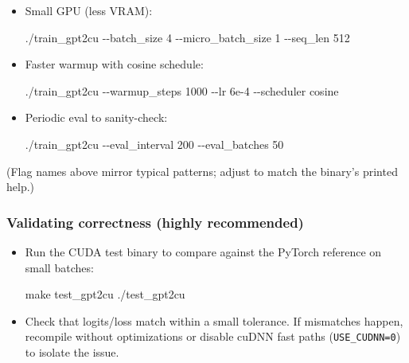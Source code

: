 \documentclass[
  letterpaper,
  DIV=11,
  numbers=noendperiod]{scrreprt}
\newenvironment{Shaded}{\begin{snugshade}}{\end{snugshade}}
\newcommand{\AttributeTok}[1]{\textcolor[rgb]{0.40,0.45,0.13}{#1}}
\newcommand{\ExtensionTok}[1]{\textcolor[rgb]{0.00,0.23,0.31}{#1}}
\newcommand{\FunctionTok}[1]{\textcolor[rgb]{0.28,0.35,0.67}{#1}}
\newcommand{\NormalTok}[1]{\textcolor[rgb]{0.00,0.23,0.31}{#1}}
\begin{document}
\begin{itemize}
\item
  Small GPU (less VRAM):

\begin{Shaded}
\begin{Highlighting}[]
\ExtensionTok{./train\_gpt2cu} \AttributeTok{{-}{-}batch\_size}\NormalTok{ 4 }\AttributeTok{{-}{-}micro\_batch\_size}\NormalTok{ 1 }\AttributeTok{{-}{-}seq\_len}\NormalTok{ 512}
\end{Highlighting}
\end{Shaded}
\item
  Faster warmup with cosine schedule:

\begin{Shaded}
\begin{Highlighting}[]
\ExtensionTok{./train\_gpt2cu} \AttributeTok{{-}{-}warmup\_steps}\NormalTok{ 1000 }\AttributeTok{{-}{-}lr}\NormalTok{ 6e{-}4 }\AttributeTok{{-}{-}scheduler}\NormalTok{ cosine}
\end{Highlighting}
\end{Shaded}
\item
  Periodic eval to sanity-check:

\begin{Shaded}
\begin{Highlighting}[]
\ExtensionTok{./train\_gpt2cu} \AttributeTok{{-}{-}eval\_interval}\NormalTok{ 200 }\AttributeTok{{-}{-}eval\_batches}\NormalTok{ 50}
\end{Highlighting}
\end{Shaded}
\end{itemize}

(Flag names above mirror typical patterns; adjust to match the binary's
printed help.)

\subsubsection{Validating correctness (highly
recommended)}\label{validating-correctness-highly-recommended}

\begin{itemize}
\item
  Run the CUDA test binary to compare against the PyTorch reference on
  small batches:

\begin{Shaded}
\begin{Highlighting}[]
\FunctionTok{make}\NormalTok{ test\_gpt2cu}
\ExtensionTok{./test\_gpt2cu}
\end{Highlighting}
\end{Shaded}
\item
  Check that logits/loss match within a small tolerance. If mismatches
  happen, recompile without optimizations or disable cuDNN fast paths
  (\texttt{USE\_CUDNN=0}) to isolate the issue.
\end{itemize}
\end{document}
